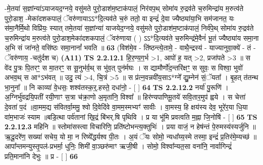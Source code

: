 \documentclass[17pt]{extarticle}
\begin{document}
                  -मे॒तया॑ स॒ज्ञांन्या॑ऽयाजयद॒ग्नये॒ वसु॑मते पुरो॒डाश॑म॒ष्टाक॑पालं॒ निर॑वप॒थ् सोमा॑य रु॒द्रव॑ते च॒रुमिन्द्रा॑य म॒रुत्व॑ते पुरो॒डाश॒ -मेका॑दशकपालं॒ ॅवरु॑णायाऽऽ*दि॒त्यव॑ते च॒रुं ततो॒ वा इन्द्रं॑ दे॒वा ज्यैष्ठ्या॑या॒भि सम॑जानत॒ यः स॑मा॒नैर्मि॒थो विप्रि॑यः॒ स्यात् तमे॒तया॑ स॒ज्ञांन्या॑ याजयेद॒ग्नये॒ वसु॑मते पुरो॒डाश॑म॒ष्टाक॑पालं॒ निर्व॑पे॒थ् सोमा॑य रु॒द्रव॑ते च॒रुमिन्द्रा॑य म॒रुत्व॑ते पुरो॒डाश॒मेका॑दशकपालं॒ ॅवरु॑णाया ( ) ऽऽ*दि॒त्यव॑ते च॒रुमिन्द्र॑मे॒वैनं॑ भू॒तं ज्यैष्ठ्या॑य समा॒ना अ॒भि सं जा॑नते॒ वसि॑ष्ठः समा॒नानां᳚ भवति ॥ \textbf{  63} \newline
                  \newline
                      (विश॑मे॒व - ति॑ष्ठन्त्ये॒तामे॒ - वाथै॒न्द्रस्य॑ - याज्यानुवा॒क्ये॑ - तं - ॅवरु॑णाय॒ -चतु॑र्दश च)  \textbf{(A11)} \newline \newline
                                        \textbf{ TS 2.2.12.1} \newline
                  हि॒र॒ण्य॒ग॒र्भ >1, आपो॑ ह॒ यत् >2, प्रजा॑पते >3 ॥ स वे॑द पु॒त्रः पि॒तरꣳ॒॒ स मा॒तरꣳ॒॒ स सू॒नुभ॑र्व॒थ् स भु॑व॒त् पुन॑र्मघः । स द्यामौर्णो॑द॒न्तरि॑क्षꣳ॒॒ स सुवः॒ स विश्वा॒ भुवो॑ अभव॒थ् स आ*ऽभ॑वत् ॥ उदु॒ त्यं >4, चि॒त्रं >5 ॥ स प्र॑त्न॒वन्नवी॑य॒साऽ*ग्ने᳚ द्यु॒म्नेन॑ सं॒ॅयता᳚ । बृ॒हत् त॑तन्थ भा॒नुना᳚ ॥ नि काव्या॑ वे॒धसः॒ शश्व॑तस्क॒र्॒.हस्ते॒ दधा॑नो॒ - [  ] \textbf{  64} \newline
                  \newline
                                \textbf{ TS 2.2.12.2} \newline
                  नर्या॑ पु॒रूणि॑ । अ॒ग्निर्भु॑वद्रयि॒पती॑ रयी॒णाꣳ स॒त्रा च॑क्रा॒णो अ॒मृता॑नि॒ विश्वा᳚ ॥ हिर॑ण्यपाणिमू॒तये॑ सवि॒तार॒मुप॑ ह्वये । स चेत्ता॑ दे॒वता॑ प॒दं ॥वा॒मम॒द्य स॑वितर्वा॒ममु॒ श्वो दि॒वेदि॑वे वा॒मम॒स्मभ्यꣳ॑ सावीः । वा॒मस्य॒ हि क्षय॑स्य देव॒ भूरे॑र॒या धि॒या वा॑म॒भाजः॑ स्याम ॥बडि॒त्था पर्व॑तानां खि॒द्रं बि॑भर्.षि पृथिवि । प्र या भू॑मि प्रवत्वति म॒ह्ना जि॒नोषि॑ - [  ] \textbf{  65} \newline
                  \newline
                                \textbf{ TS 2.2.12.3} \newline
                  महिनि ॥ स्तोमा॑सस्त्वा विचारिणि॒ प्रति॑ष्टोभन्त्य॒क्तुभिः॑ । प्रया वाजं॒ न हेष॑न्तं पे॒रुमस्य॑स्यर्जुनि ॥ ऋ॒दू॒दरे॑ण॒ सख्या॑ सचेय॒ यो मा॒ न रिष्ये᳚द्धर्यश्व पी॒तः । अ॒यं ॅयः सोमो॒ न्यधा᳚य्य॒स्मे तस्मा॒ इन्द्रं॑ प्र॒तिर॑मे॒म्यच्छ॑ ॥ आपा᳚न्तमन्युस्तृ॒पल॑-प्रभर्मा॒ धुनिः॒ शिमी॑ वा॒ञ्छरु॑माꣳ ऋजी॒षी । सोमो॒ विश्वा᳚न्यत॒सा वना॑नि॒ नार्वागिन्द्रं॑ प्रति॒माना॑नि देभुः ॥ प्र - [  ] \textbf{  66} \newline
\end{document}
